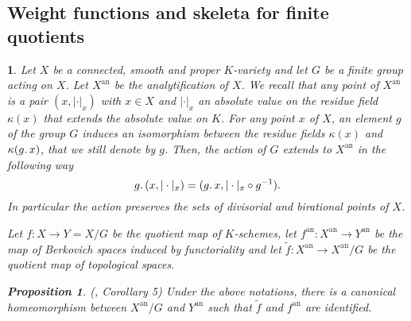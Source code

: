 \documentclass{amsart}%
\numberwithin{equation}{subsection}
\theoremstyle{plain2}
\newtheorem{prop}[equation]{Proposition}
\theoremstyle{definition2}
\theoremstyle{stepstyle}
\theoremstyle{point}
\theoremstyle{subpoint}
\newtheorem{subpoint}[equation]{}%
\newcommand{\spa}[1]{\begin{subpoint}#1\end{subpoint}}           %
\newcommand{\an}{\mathrm{an}}
\begin{document}
\subsection{Weight functions and skeleta for finite quotients}

\spa{Let $X$ be a connected, smooth  and proper $K$-variety and let $G$ be a finite group acting on $X$. Let $X^{\an}$ be the analytification of $X$. We recall that any point of $X^{\an}$ is a pair $(x,|\cdot|_x)$ with $x \in X$ and $|\cdot|_x$ an absolute value on the residue field $\kappa(x)$ that extends the absolute value on $K$. For any point $x$ of $X$, an element $g$ of the group $G$ induces an isomorphism between the residue fields $\kappa(x)$ and $\kappa(g \ldotp x)$, that we still denote by $g$. Then, the action of $G$ extends to $X^\an$ in the following way $$g \ldotp (x,|\cdot|_x) = ( g \ldotp x,  |\cdot|_x \circ g^{-1}).$$ In particular the action preserves the sets of divisorial and birational points of $X$.

Let $f: X \rightarrow Y=X/G$ be the quotient map of $K$-schemes, let $f^\an: X^\an \rightarrow Y^\an$ be the map of Berkovich spaces induced by functoriality and let $\tilde{f}: X^\an \rightarrow X^\an/G$ be the quotient map of topological spaces.
\begin{prop} (\cite{Berkovich}, Corollary 5) \label{prop Berk identification of quotient}
Under the above notations, there is a canonical homeomorphism between $X^\an/G $ and $Y^\an$ such that $\tilde{f}$ and $f^\an$ are identified.
\end{prop}
}
\end{document}
